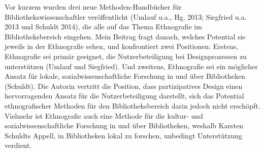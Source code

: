 Vor kurzem wurden drei neue Methoden-Handbücher für
Bibliothekswissenschaftler veröffentlicht (Umlauf u.a., Hg. 2013;
Siegfried u.a. 2013 und Schuldt 2014), die alle auf das Thema
Ethnografie im Bibliotheksbereich eingehen. Mein Beitrag fragt danach,
welches Potential sie jeweils in der Ethnografie sehen, und konfrontiert
zwei Positionen: Erstens, Ethnografie sei primär geeignet, die
Nutzerbeteiligung bei Designprozessen zu unterstützen (Umlauf und
Siegfried). Und zweitens, Ethnografie sei ein möglicher Ansatz für
lokale, sozialwissenschaftliche Forschung in und über Bibliotheken
(Schuldt). Die Autorin vertritt die Position, dass partizipatives Design
einen hervorragenden Ansatz für die Nutzerbeteiligung darstellt, sich
das Potential ethnografischer Methoden für den Bibliotheksbereich darin
jedoch nicht erschöpft. Vielmehr ist Ethnografie auch eine Methode für
die kultur- und sozialwissenschaftliche Forschung in und über
Bibliotheken, weshalb Karsten Schuldts Appell, in Bibliotheken lokal zu
forschen, unbedingt Unterstützung verdient.
